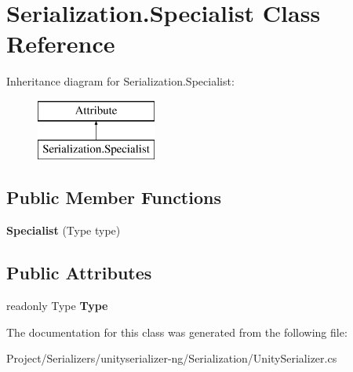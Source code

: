 \hypertarget{class_serialization_1_1_specialist}{}\section{Serialization.\+Specialist Class Reference}
\label{class_serialization_1_1_specialist}
Inheritance diagram for Serialization.\+Specialist\+:\begin{figure}[H]
\begin{center}
\leavevmode
\includegraphics[height=2.000000cm]{class_serialization_1_1_specialist}
\end{center}
\end{figure}
\subsection*{Public Member Functions}
\begin{DoxyCompactItemize}
\item 
\mbox{\label{class_serialization_1_1_specialist_af1f9433f221cfd4490f5d30f4045e06f}} 
{\bfseries Specialist} (Type type)
\end{DoxyCompactItemize}
\subsection*{Public Attributes}
\begin{DoxyCompactItemize}
\item 
\mbox{\label{class_serialization_1_1_specialist_aa9b0e99569f13034ea86bfb104c79be3}} 
readonly Type {\bfseries Type}
\end{DoxyCompactItemize}


The documentation for this class was generated from the following file\+:\begin{DoxyCompactItemize}
\item 
Project/\+Serializers/unityserializer-\/ng/\+Serialization/Unity\+Serializer.\+cs\end{DoxyCompactItemize}
